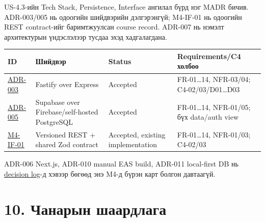 \documentclass[
  mongolian,
]{article}
\begin{document}
US-4.3-ийн Tech Stack, Persistence, Interface ангилал бүрд нэг MADR
бичив. ADR-003/005 нь одоогийн шийдвэрийн дэлгэрэнгүй; M4-IF-01 нь
одоогийн REST contract-ийг баримтжуулсан course record. ADR-007 нь
нэмэлт архитектурын үндэслэлээр тусдаа эхэд хадгалагдана.

\begin{longtable}[]{@{}
  >{\raggedright\arraybackslash}p{}
  >{\raggedright\arraybackslash}p{}
  >{\raggedright\arraybackslash}p{}
  >{\raggedright\arraybackslash}p{}@{}}
\toprule\noalign{}
\begin{minipage}[b]{\linewidth}\raggedright
ID
\end{minipage} & \begin{minipage}[b]{\linewidth}\raggedright
Шийдвэр
\end{minipage} & \begin{minipage}[b]{\linewidth}\raggedright
Status
\end{minipage} & \begin{minipage}[b]{\linewidth}\raggedright
Requirements/C4 холбоо
\end{minipage} \\
\midrule\noalign{}
\endhead
\bottomrule\noalign{}
\endlastfoot
\href{https://github.com/Tengis01/Nogoolin/blob/main/docs/architecture/adr/adr-003-fastify.md}{ADR-003}
& Fastify over Express & Accepted & FR-01\ldots14, NFR-03/04;
C4-02/03/D01\ldots D03 \\
\href{https://github.com/Tengis01/Nogoolin/blob/main/docs/architecture/adr/adr-005-supabase.md}{ADR-005}
& Supabase over Firebase/self-hosted PostgreSQL & Accepted &
FR-01\ldots14, NFR-01/05; бүх data/auth view \\
\href{https://github.com/Tengis01/Nogoolin/blob/main/docs/architecture/adr/m4-if-01-rest-interface.md}{M4-IF-01}
& Versioned REST + shared Zod contract & Accepted, existing
implementation & FR-01\ldots14, NFR-01/03; C4-02/03 \\
\end{longtable}

ADR-006 Next.js, ADR-010 manual EAS build, ADR-011 local-first DB нь
\href{https://github.com/Tengis01/Nogoolin/blob/main/agent-context/DECISIONS.md}{decision
log}-д хэвээр бөгөөд энэ M4-д бүрэн карт болгон давтаагүй.

\section{10. Чанарын
шаардлага}\label{ux447ux430ux43dux430ux440ux44bux43d-ux448ux430ux430ux440ux434ux43bux430ux433ux430}
\end{document}
